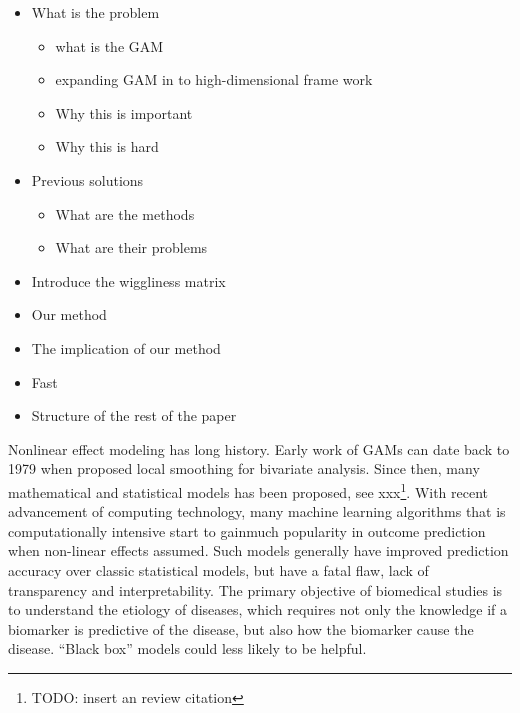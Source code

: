 \documentclass[AMA,STIX1COL,]{WileyNJD-v2}
\providecommand{\tightlist}{%
  \setlength{\itemsep}{0pt}\setlength{\parskip}{0pt}}
\begin{document}
\begin{itemize}
\item
  What is the problem

  \begin{itemize}
  \tightlist
  \item
    what is the GAM
  \item
    expanding GAM in to high-dimensional frame work
  \item
    Why this is important
  \item
    Why this is hard
  \end{itemize}
\item
  Previous solutions

  \begin{itemize}
  \tightlist
  \item
    What are the methods
  \item
    What are their problems
  \end{itemize}
\item
  Introduce the wiggliness matrix
\item
  Our method
\item
  The implication of our method
\item
  Fast
\item
  Structure of the rest of the paper
\end{itemize}

Nonlinear effect modeling has long history. Early work of GAMs can date
back to 1979 when \citet{Cleveland1979} proposed local smoothing for
bivariate analysis. Since then, many mathematical and statistical models
has been proposed, see xxx\footnote{TODO: insert an review citation}.
With recent advancement of computing technology, many machine learning
algorithms that is computationally intensive start to gainmuch
popularity in outcome prediction when non-linear effects assumed. Such
models generally have improved prediction accuracy over classic
statistical models, but have a fatal flaw, lack of transparency and
interpretability. The primary objective of biomedical studies is to
understand the etiology of diseases, which requires not only the
knowledge if a biomarker is predictive of the disease, but also how the
biomarker cause the disease. ``Black box'' models could less likely to
be helpful.
\end{document}
